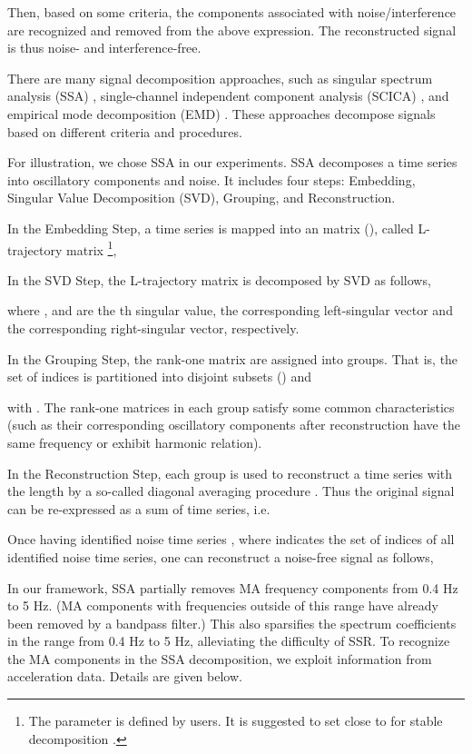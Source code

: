 \documentclass[10pt,twocolumn]{IEEEtran}
\begin{document}
Then, based on some criteria, the components associated with noise/interference are recognized and removed from the above expression. The reconstructed signal is thus noise- and interference-free.


There are many signal decomposition approaches, such as singular spectrum analysis (SSA) \cite{golyandina2001SSA,harris2010filtering}, single-channel independent component analysis (SCICA) \cite{james2003extracting,davies2007source},  and empirical mode decomposition (EMD) \cite{huang1998empirical}. These approaches decompose signals based on different criteria and procedures.

For illustration, we chose SSA in our experiments. SSA decomposes a time series into oscillatory components and noise. It includes four steps: Embedding, Singular Value Decomposition (SVD), Grouping, and Reconstruction.

In the Embedding Step, a time series  is mapped into an  matrix (), called L-trajectory matrix \footnote{The parameter  is defined by users. It is suggested to set  close to  for stable decomposition \cite{golyandina2001SSA}.},



In the SVD Step, the L-trajectory matrix is decomposed by SVD as follows,

where , and  are the th singular value, the corresponding left-singular vector and the corresponding right-singular vector, respectively.


In the Grouping Step, the  rank-one matrix  are assigned into  groups. That is, the set of indices  is partitioned into  disjoint subsets  () and

with . The rank-one matrices in each group  satisfy some common characteristics (such as their corresponding  oscillatory components after reconstruction have the same frequency or exhibit harmonic relation).

In the Reconstruction Step, each group  is used to reconstruct a time series  with the length  by a so-called diagonal averaging procedure \cite{golyandina2001SSA}. Thus the original signal  can be re-expressed as a sum of  time series, i.e.

Once having identified noise time series , where  indicates the set of indices of all identified noise time series, one can reconstruct a noise-free signal as follows,




In our framework, SSA partially removes MA frequency components from 0.4 Hz to 5 Hz. (MA components with frequencies outside of this range have already been removed by a bandpass filter.) This also sparsifies the spectrum coefficients in the range from 0.4 Hz to 5 Hz, alleviating the difficulty of SSR. To recognize the MA components in the SSA decomposition, we exploit information from acceleration data. Details are given below.
\end{document}
